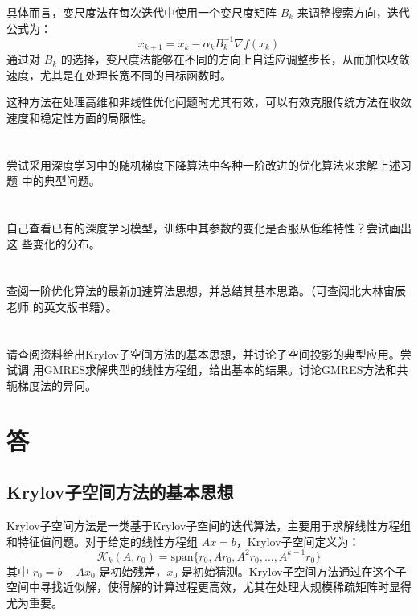 \documentclass[a4paper]{article}
\begin{document}
具体而言，变尺度法在每次迭代中使用一个变尺度矩阵 $B_k$ 来调整搜索方向，迭代公式为：
\[
x_{k+1} = x_k - \alpha_k B_k^{-1} \nabla f(x_k)
\]
通过对 $B_k$ 的选择，变尺度法能够在不同的方向上自适应调整步长，从而加快收敛速度，尤其是在处理长宽不同的目标函数时。

这种方法在处理高维和非线性优化问题时尤其有效，可以有效克服传统方法在收敛速度和稳定性方面的局限性。


\section{}

尝试采用深度学习中的随机梯度下降算法中各种一阶改进的优化算法来求解上述习题
中的典型问题。

\section{}

自己查看已有的深度学习模型，训练中其参数的变化是否服从低维特性？尝试画出这
些变化的分布。

\section{}

查阅一阶优化算法的最新加速算法思想，并总结其基本思路。（可查阅北大林宙辰老师
的英文版书籍）。

\section{}

请查阅资料给出Krylov子空间方法的基本思想，并讨论子空间投影的典型应用。尝试调
用GMRES求解典型的线性方程组，给出基本的结果。讨论GMRES方法和共轭梯度法的异同。

\section{答}

\subsection{Krylov子空间方法的基本思想}

Krylov子空间方法是一类基于Krylov子空间的迭代算法，主要用于求解线性方程组和特征值问题。对于给定的线性方程组 $Ax = b$，Krylov子空间定义为：
\[
\mathcal{K}_k(A, r_0) = \text{span}\{r_0, Ar_0, A^2r_0, \ldots, A^{k-1}r_0\}
\]
其中 $r_0 = b - Ax_0$ 是初始残差，$x_0$ 是初始猜测。Krylov子空间方法通过在这个子空间中寻找近似解，使得解的计算过程更高效，尤其在处理大规模稀疏矩阵时显得尤为重要。
\end{document}
